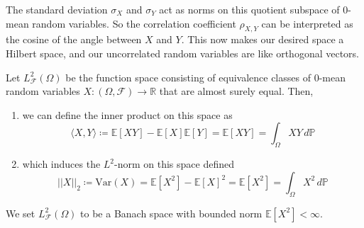    The standard deviation $\sigma_X$ and $\sigma_Y$ act as norms on this quotient subspace of $0$-mean random variables. So the correlation coefficient $\rho_{X, Y}$ can be interpreted as the cosine of the angle between $X$ and $Y$. This now makes our desired space a Hilbert space, and our uncorrelated random variables are like orthogonal vectors. 

    \begin{definition}
      Let $L^2_\mathcal{F} (\Omega)$ be the function space consisting of equivalence classes of $0$-mean random variables $X: (\Omega, \mathcal{F}) \rightarrow \mathbb{R}$ that are almost surely equal. Then, 
      \begin{enumerate}
        \item we can define the inner product on this space as 
        \begin{equation}
          \langle X, Y \rangle \coloneqq \mathbb{E}[X Y] - \mathbb{E}[X] \mathbb{E}[Y] = \mathbb{E}[X Y] = \int_\Omega X Y \,d\mathbb{P}
        \end{equation}

        \item which induces the $L^2$-norm on this space defined 
        \begin{equation}
          ||X||_2 \coloneqq \mathrm{Var}(X) = \mathbb{E}[X^2] - \mathbb{E}[X]^2 = \mathbb{E}[X^2] = \int_\Omega X^2 \,d\mathbb{P}
        \end{equation}
      \end{enumerate}
      We set $L^2_\mathcal{F} (\Omega)$ to be a Banach space with bounded norm $\mathbb{E}[X^2] < \infty$. 
    \end{definition}

